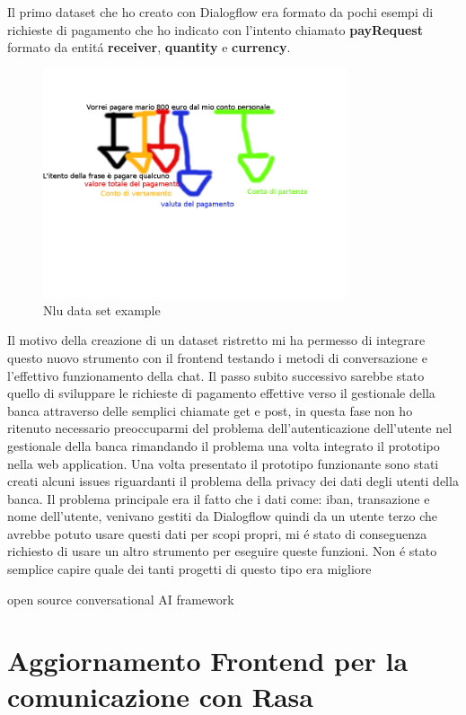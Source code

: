 Il primo dataset che ho creato con Dialogflow era formato da pochi esempi di richieste di pagamento che ho indicato con l'intento chiamato \textbf{payRequest} formato da entit\'a \textbf{receiver}, \textbf{quantity} e \textbf{currency}.
\begin{figure}[H]
 \centering
  \includegraphics[width=0.8\textwidth]{img/nludatasetexample.png}
 \caption{Nlu data set example}
\end{figure}
Il motivo della creazione di un dataset ristretto mi ha permesso di integrare questo nuovo strumento con il frontend testando i metodi di conversazione e l'effettivo funzionamento della chat.
Il passo subito successivo sarebbe stato quello di sviluppare le richieste di pagamento effettive verso il gestionale della banca attraverso delle semplici chiamate get e post, in questa fase non ho ritenuto necessario preoccuparmi del problema dell'autenticazione dell'utente nel gestionale della banca rimandando il problema una volta integrato il prototipo nella web application.
Una volta presentato il prototipo funzionante sono stati creati alcuni issues riguardanti il problema della privacy dei dati degli utenti della banca. 
Il problema principale era il fatto che i dati come: iban, transazione e nome dell'utente, venivano gestiti da Dialogflow quindi da un utente terzo che avrebbe potuto usare questi dati per scopi propri, mi \'e stato di conseguenza richiesto di usare un altro strumento per eseguire queste funzioni.
Non \'e stato semplice capire quale dei tanti progetti di questo tipo era migliore


open source conversational AI framework

\section{Aggiornamento Frontend per la comunicazione con Rasa}


